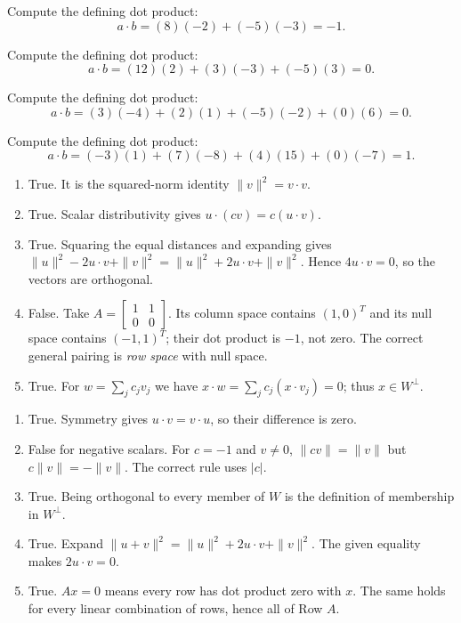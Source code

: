 Compute the defining dot product:
\[a\cdot b=(8)(-2)+(-5)(-3)=-1.\]

Compute the defining dot product:
\[a\cdot b=(12)(2)+(3)(-3)+(-5)(3)=0.\]

Compute the defining dot product:
\[a\cdot b=(3)(-4)+(2)(1)+(-5)(-2)+(0)(6)=0.\]

Compute the defining dot product:
\[a\cdot b=(-3)(1)+(7)(-8)+(4)(15)+(0)(-7)=1.\]

\begin{enumerate}[label=(\alph*)]
\item True. It is the squared-norm identity $\|v\|^2=v\cdot v$.
\item True. Scalar distributivity gives $u\cdot(cv)=c(u\cdot v)$.
\item True. Squaring the equal distances and expanding gives
$\|u\|^2-2u\cdot v+\|v\|^2=\|u\|^2+2u\cdot v+\|v\|^2$.
Hence $4u\cdot v=0$, so the vectors are orthogonal.
\item False. Take $A=\begin{bmatrix}1&1\\0&0\end{bmatrix}$.
Its column space contains $(1,0)^T$ and its null space contains
$(-1,1)^T$; their dot product is $-1$, not zero. The correct general
pairing is \emph{row space} with null space.
\item True. For $w=\sum_jc_jv_j$ we have
$x\cdot w=\sum_jc_j(x\cdot v_j)=0$; thus $x\in W^\perp$.
\end{enumerate}

\begin{enumerate}[label=(\alph*)]
\item True. Symmetry gives $u\cdot v=v\cdot u$, so their difference
is zero.
\item False for negative scalars. For $c=-1$ and $v\ne0$,
$\|cv\|=\|v\|$ but $c\|v\|=-\|v\|$. The correct rule uses $|c|$.
\item True. Being orthogonal to every member of $W$ is the definition
of membership in $W^\perp$.
\item True. Expand $\|u+v\|^2=\|u\|^2+2u\cdot v+\|v\|^2$.
The given equality makes $2u\cdot v=0$.
\item True. $Ax=0$ means every row has dot product zero with $x$.
The same holds for every linear combination of rows, hence all of Row $A$.
\end{enumerate}

